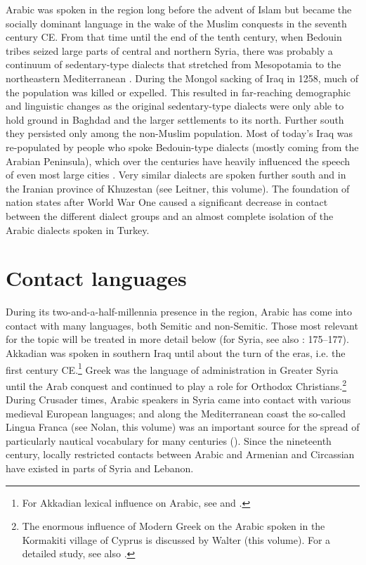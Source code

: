 \documentclass[output=paper]{langsci/langscibook}
\begin{document}
Arabic was spoken in the region long before the advent of Islam \citep[95]{Donner1981} but became the socially dominant language in the wake of the Muslim conquests in the seventh century CE. From that time until the end of the tenth century, when Bedouin tribes seized large parts of central and northern Syria, there was probably a continuum of sedentary-type dialects that stretched from Mesopotamia to the northeastern Mediterranean \citep[291]{Procházka2018Fertile}. During the Mongol sacking of Iraq in 1258, much of the population was killed or expelled. This resulted in far-reaching demographic and linguistic changes as the original sedentary-type dialects were only able to hold ground in Baghdad and the larger settlements to its north. Further south they persisted only among the non-Muslim population. Most of today’s Iraq was re-populated by people who spoke Bedouin-type dialects (mostly coming from the Arabian Peninsula), which over the centuries have heavily influenced the speech of even most large cities \citep{Holes2007}. Very similar dialects are spoken further south and in the Iranian province of Khuzestan (see Leitner, this volume). The foundation of nation states after World War One caused a significant decrease in contact between the different dialect groups and an almost complete isolation of the Arabic dialects spoken in Turkey.

\section{Contact languages} 

During its two-and-a-half-millennia presence in the region, Arabic has come into contact with many languages, both Semitic and non-Semitic. Those most relevant for the topic will be treated in more detail below (for Syria, see also \citealt{Barbot1961}: 175--177). Akkadian was spoken in southern Iraq until about the turn of the eras, i.e. the first century CE.\footnote{For Akkadian lexical influence on Arabic, see \citet{Holes2002} and \citet{Krebernik2008}.} Greek was the language of administration in Greater Syria until the Arab conquest \citep[185--187]{Magidow2013} and continued to play a role for Orthodox Christians.\footnote{The enormous influence of Modern Greek on the Arabic spoken in the Kormakiti village of Cyprus is discussed by Walter (this volume). For a detailed study, see also \citet{Borg1985}.} During Crusader times, Arabic speakers in Syria came into contact with various medieval European languages; and along the Mediterranean coast the so-called Lingua Franca (see Nolan, this volume) was an important source for the spread of particularly nautical vocabulary for many centuries (\citealt{KahaneKahaneTietze1958}). Since the nineteenth century, locally restricted contacts between Arabic and Armenian and Circassian have existed in parts of Syria and Lebanon. 
\end{document}
